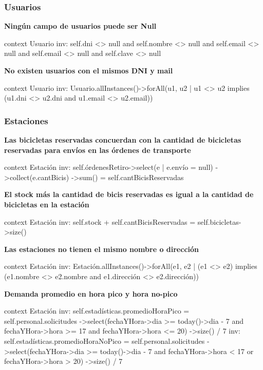 \documentclass[a4paper, 10pt, twoside]{article}
\newenvironment{ocl}[1]
  {
    \textbf{#1}
    \verbatim
  }{
    \endverbatim
  }
\begin{document}
\subsubsection{Usuarios}

\begin{ocl}{Ningún campo de usuarios puede ser Null}
  context Usuario
  inv: self.dni <> null and
       self.nombre <> null and
       self.email <> null and
       self.email <> null and
       self.clave <> null
\end{ocl}

\begin{ocl}{No existen usuarios con el mismos DNI y mail}
  context Usuario
  inv: Usuario.allInstances()->forAll(u1, u2 |
           u1 <> u2 implies (u1.dni <> u2.dni and u1.email <> u2.email))
\end{ocl}


\subsubsection{Estaciones}

\begin{ocl}{Las bicicletas reservadas concuerdan con la cantidad de bicicletas reservadas para envíos en las órdenes de transporte}
  context Estación
  inv: self.órdenesRetiro->select(e | e.envío = null)
                         ->collect(e.cantBicis)
                         ->sum() = self.cantBicisReservadas
\end{ocl}

\begin{ocl}{El stock más la cantidad de bicis reservadas es igual a la cantidad de bicicletas en la estación}
  context Estación
  inv: self.stock + self.cantBicisReservadas = self.bicicletas->size()
\end{ocl}

\begin{ocl}{Las estaciones no tienen el mismo nombre o dirección}
  context Estación
  inv: Estación.allInstances()->forAll(e1, e2 |
           (e1 <> e2) implies (e1.nombre <> e2.nombre and e1.dirección <> e2.dirección))
\end{ocl}

\begin{ocl}{Demanda promedio en hora pico y hora no-pico}
  context Estación
  inv: self.estadísticas.promedioHoraPico = 
       self.personal.solicitudes
           ->select(fechaYHora->dia >= today()->dia - 7 and
                    fechaYHora->hora >= 17 and
                    fechaYHora->hora <= 20)
           ->size() / 7
  inv: self.estadísticas.promedioHoraNoPico = 
       self.personal.solicitudes
           ->select(fechaYHora->dia >= today()->dia - 7 and
                    fechaYHora->hora < 17 or
                    fechaYHora->hora > 20)
           ->size() / 7
\end{ocl}
\end{document}
